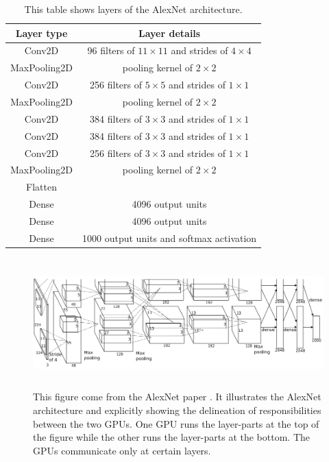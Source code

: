 \documentclass[11pt]{report}
\begin{document}
\begin{table}[h!]
\centering
\begin{tabular}{  c  c  }
Layer type & Layer details\\
\hline
Conv2D & 96 filters of $11\times11$ and strides of $4\times4$ \\
MaxPooling2D & pooling kernel of $2\times2$ \\
Conv2D & 256 filters of $5\times5$ and strides of $1\times1$ \\
MaxPooling2D & pooling kernel of $2\times2$ \\
Conv2D & 384 filters of $3\times3$ and strides of $1\times1$ \\
Conv2D & 384 filters of $3\times3$ and strides of $1\times1$ \\
Conv2D & 256 filters of $3\times3$ and strides of $1\times1$ \\
MaxPooling2D & pooling kernel of $2\times2$ \\
Flatten & \\
Dense & 4096 output units \\
Dense & 4096 output units \\
Dense & 1000 output units and softmax activation
\end{tabular}
\caption[AlexNet architecture]{This table shows layers of the AlexNet architecture.}
\label{table:alexnet}
\end{table}

\begin{figure}[h]
\centering
\includegraphics[width=15cm, height=5cm]{alexnet}
\caption[AlexNet architecture]{This figure come from the AlexNet paper \cite{DBLP:journals/cacm/KrizhevskySH17}. It illustrates the AlexNet architecture and explicitly showing the delineation of responsibilities between the two GPUs. One GPU runs the layer-parts at the top of the figure while the other runs the layer-parts at the bottom. The GPUs communicate only at certain layers.}
\label{fig:alexnet}
\end{figure}
\end{document}
